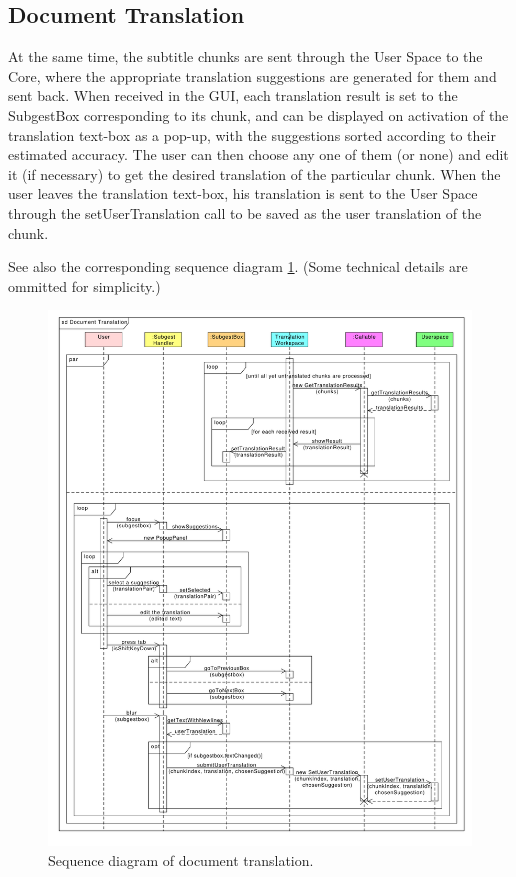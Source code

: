 \subsection{Document Translation}
\label{sec:document_translation}

At the same time, the subtitle chunks are sent through the User Space to the Core, where the appropriate translation suggestions are generated for them and sent back. When received in the GUI, each translation result is set to the SubgestBox corresponding to its chunk, and can be displayed on activation of the translation text-box as a pop-up, with the suggestions sorted according to their estimated accuracy.
The user can then choose any one of them (or none) and edit it (if necessary) to get the desired translation of the particular chunk. When the user leaves the translation text-box, his translation is sent to the User Space through the setUserTranslation call to be saved as the user translation of the chunk.

See also the corresponding sequence diagram \ref{gui:sd:document_translation}.
(Some technical details are ommitted for simplicity.)

\begin{figure}[h]
\begin{center}
\includegraphics[scale=0.45]{figures/document_translation_sequence.pdf}
\end{center}
\caption{Sequence diagram of document translation.}\label{gui:sd:document_translation}
\end{figure}

